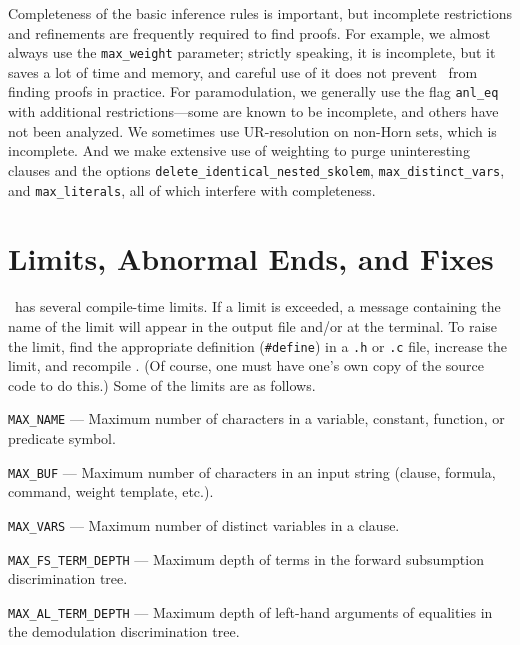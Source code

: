 \documentclass[11pt]{article}
\begin{document}
Completeness of the basic inference rules is important, but incomplete
restrictions and refinements are frequently required to find proofs.
For example, we almost always use the \verb:max_weight: parameter;
strictly speaking, it is incomplete, but it saves a lot of time and
memory, and careful use of it does not prevent \otter\ from finding
proofs in practice.  For paramodulation, we generally use the
flag \verb:anl_eq: with additional restrictions---some
are known to be incomplete, and others have not been analyzed.
We sometimes use UR-resolution on non-Horn sets, which is incomplete.
And we make extensive use of weighting to purge uninteresting
clauses and the options \verb:delete_identical_nested_skolem:,
\verb:max_distinct_vars:, and \verb:max_literals:, all of which
interfere with completeness.

\section{Limits, Abnormal Ends, and Fixes}

\otter\ has several compile-time limits.
If a limit is exceeded, a message containing the name of the limit
will appear in the output file and/or at the terminal.  To raise the
limit, find the appropriate definition (\verb:#define:) in a
\verb:.h: or \verb:.c: file, increase the limit, and recompile \otter.
(Of course, one must have one's own copy of the source code to
do this.)  Some of the limits are as follows.

\noindent \verb:MAX_NAME: --- Maximum number of characters in a variable,
constant, function, or predicate symbol.

\noindent \verb:MAX_BUF: --- Maximum number of characters in an input string
(clause, formula, command, weight template, etc.).

\noindent \verb:MAX_VARS: --- Maximum number of distinct variables in a clause.

\noindent \verb:MAX_FS_TERM_DEPTH: --- Maximum depth of terms in
the forward subsumption discrimination tree.

\noindent \verb:MAX_AL_TERM_DEPTH: --- Maximum depth of left-hand arguments of
equalities in the demodulation discrimination tree.
\end{document}
